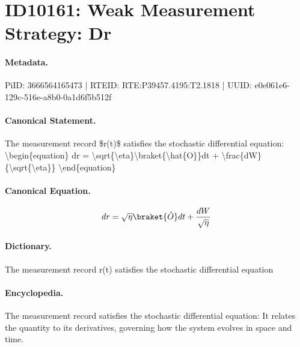 \section*{ID10161: Weak Measurement Strategy: Dr}
\paragraph{Metadata.}
PiID: 3666564165473 | RTEID: RTE:P39457.4195:T2.1818 | UUID: e0e061e6-129c-516e-a8b0-0a1d6f5b512f

\paragraph{Canonical Statement.}
The measurement record \$r(t)\$ satisfies the stochastic differential equation: \textbackslash{}begin\{equation\} dr = \textbackslash{}sqrt\{\textbackslash{}eta\}\textbackslash{}braket\{\textbackslash{}hat\{O\}\}dt + \textbackslash{}frac\{dW\}\{\textbackslash{}sqrt\{\textbackslash{}eta\}\} \textbackslash{}end\{equation\}

\paragraph{Canonical Equation.}
\[
dr = \sqrt{\eta}\braket{\hat{O}}dt + \frac{dW}{\sqrt{\eta}}
\]

\paragraph{Dictionary.}
The measurement record r(t) satisfies the stochastic differential equation

\paragraph{Encyclopedia.}
The measurement record satisfies the stochastic differential equation: It relates the quantity to its derivatives, governing how the system evolves in space and time.

